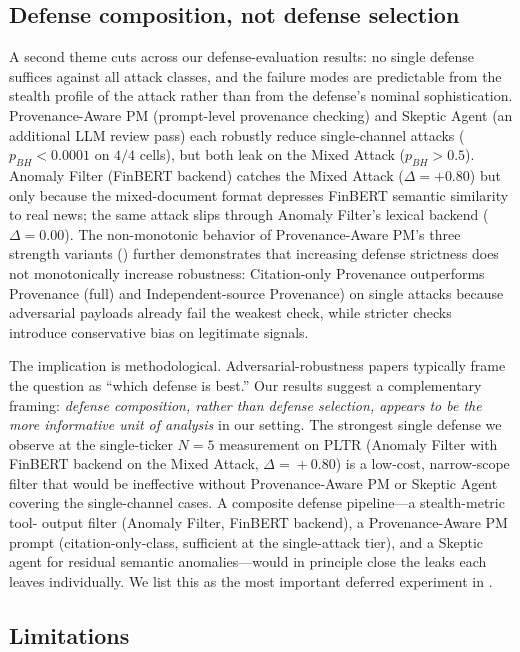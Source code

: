 \documentclass[10pt,letterpaper]{article}
\begin{document}
\subsection{Defense composition, not defense selection}
\label{sec:disc-composition}

A second theme cuts across our defense-evaluation results: no single
defense suffices against all attack classes, and the failure modes
are predictable from the stealth profile of the attack rather than
from the defense's nominal sophistication. Provenance-Aware PM (prompt-level provenance
checking) and Skeptic Agent (an additional LLM review pass) each robustly reduce
single-channel attacks ($p_{BH}<0.0001$ on $4/4$ cells), but both
leak on the Mixed Attack ($p_{BH}>0.5$). Anomaly Filter (FinBERT backend) catches
the Mixed Attack ($\Delta=+0.80$) but only because the mixed-document
format depresses FinBERT semantic similarity to real news; the same
attack slips through Anomaly Filter's lexical backend ($\Delta=0.00$). The
non-monotonic behavior of Provenance-Aware PM's three strength variants
() further demonstrates that increasing
defense strictness does not monotonically increase robustness:
Citation-only Provenance outperforms Provenance (full) and Independent-source Provenance)
on single attacks because adversarial payloads already fail the
weakest check, while stricter checks introduce conservative bias on
legitimate signals.

The implication is methodological. Adversarial-robustness papers
typically frame the question as ``which defense is best.'' Our
results suggest a complementary framing: \emph{defense composition,
rather than defense selection, appears to be the more informative
unit of analysis} in our setting. The strongest single defense we observe at the
single-ticker $N\!=\!5$ measurement on PLTR (Anomaly Filter with FinBERT backend
on the Mixed Attack, $\Delta\!=\!+0.80$) is a low-cost, narrow-scope
filter that would be ineffective without Provenance-Aware PM or Skeptic Agent covering the
single-channel cases. A composite defense pipeline---a stealth-metric tool-
output filter (Anomaly Filter, FinBERT backend), a Provenance-Aware PM prompt
(citation-only-class, sufficient at the single-attack tier), and a Skeptic
agent for residual semantic anomalies---would in principle
close the leaks each leaves individually. We list this as the most
important deferred experiment in .

\subsection{Limitations}\label{sec:disc-limits}
\end{document}
